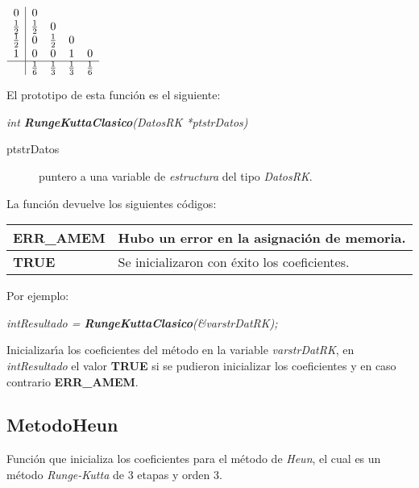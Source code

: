\begin{center}
$
\begin{array}{c|cccc}
0 & 0 \\
\frac{1}{2} & \frac{1}{2} & 0 \\
\frac{1}{2} & 0 & \frac{1}{2} & 0 \\
1 & 0 & 0 & 1 & 0 \\
\hline
 & \frac{1}{6} & \frac{1}{3} & \frac{1}{3} & \frac{1}{6} \\
\end{array}
$
\end{center}

El prototipo de esta funci\'on es el siguiente:

\begin{center}
\emph{int \textbf{RungeKuttaClasico}(DatosRK *ptstrDatos)}
\end{center}

\begin{description}
\item[ptstrDatos] puntero a una variable de \emph{estructura} del tipo
\emph{DatosRK}.
\end{description}

La funci\'on devuelve los siguientes c\'odigos:

\begin{center}
\begin{tabular}{|l|l|}
\hline
\textbf{ERR\_AMEM} & Hubo un error en la asignaci\'on de memoria. \\
\hline
\textbf{TRUE} & Se inicializaron con \'exito los coeficientes. \\
\hline
\end{tabular}
\end{center}

Por ejemplo:

\begin{center}
\emph{intResultado = \textbf{RungeKuttaClasico}(\&varstrDatRK);}
\end{center}

Inicializar\'{\i}a los coeficientes del m\'etodo en la variable 
\emph{varstrDatRK}, en \emph{intResultado} el valor \textbf{TRUE} si se pudieron
inicializar los coeficientes y en caso contrario \textbf{ERR\_AMEM}.

\subsection{MetodoHeun}
Funci\'on que inicializa los coeficientes para el m\'etodo de \emph{Heun}, el
cual es un m\'etodo \emph{Runge-Kutta} de $3$ etapas y orden $3$.\newline

